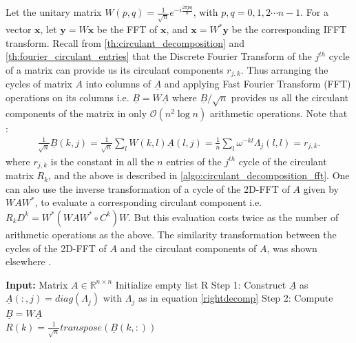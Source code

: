 \documentclass[onefignum,onetabnum]{siamart171218}
\begin{document}
\vspace{2mm}
Let the unitary matrix $W(p,q) = \frac{1}{\sqrt{n}}e^{-i \frac{2\pi pq}{n}}$, with $p,q=0,1,2\cdots n-1$. For a vector $\bm x$, let $\bm y = W \bm x$ be the FFT of $\bm x$, and $\bm x = W^* \bm y$ be the corresponding IFFT transform. Recall from \cref{th:circulant_decomposition} and \cref{th:fourier_circulant_entries} that the Discrete Fourier Transform of the $j^{th}$ cycle of a matrix can provide us its circulant components $r_{j,k}$. Thus arranging the cycles of matrix $A$ into columns of $\underline{A}$ and applying Fast Fourier Transform (FFT) operations on its columns i.e. $\underline{B}=W\underline{A}$ where $\underline{B}/\sqrt{n}$ provides us all the circulant components of the matrix in only $\mathcal{O}(n^2 \log n)$ arithmetic operations. Note that :
\begin{align}
  \frac{1}{\sqrt{n}}\underline{B}(k,j)=\frac{1}{\sqrt{n}}\sum_l W(k,l)\underline{A}(l,j) = \frac{1}{n} \sum_l \omega^{-kl}\Lambda_j(l,l)=r_{j,k}.
\end{align}
where $r_{j,k}$ is the constant in all the $n$ entries of the $j^{th}$ cycle of the circulant matrix $R_k$, and the above is described in \cref{algo:circulant_decomposition_fft}. One can also use the inverse transformation of a cycle of the 2D-FFT of $A$ given by $WAW^*$, to evaluate a corresponding circulant component i.e. $R_kD^k=W^*(WAW^* \circ C^k)W$. But this evaluation costs twice as the number of arithmetic operations as the above. The similarity transformation between the cycles of the 2D-FFT of $A$ and the circulant components of $A$, was shown elsewhere \cite{Hari2024circulant}.

\begin{algorithm}
\caption{Circulant Decomposition of a Matrix using FFT \cite{Hari2024circulant}} \label{algo:circulant_decomposition_fft}
\begin{algorithmic}
\State \textbf{Input:} Matrix \( A \in \mathbb{R}^{n \times n} \)
\State Initialize empty list R
\State Step 1: Construct $\underline{A}$ as $\underline{A}(:,j) = diag(\Lambda_j)$ with $\Lambda_j$ as in equation \eqref{rightdecomp}
\State Step 2: Compute $\underline{B} = W \underline{A}$
\State 
{} \\
     $R(k) =\frac{1}{\sqrt{n}}transpose(\underline{B}(k,:))$  
\EndFor
{} 
\end{algorithmic}
\end{algorithm}
\end{document}

